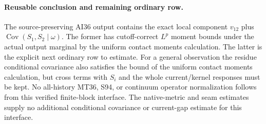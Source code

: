 \documentclass[11pt]{article}
\newcommand{\Cov}{\operatorname{Cov}}
\begin{document}
\paragraph{Reusable conclusion and remaining ordinary row.}
The source-preserving AI36 output contains the exact local component $v_{12}$ plus
$\Cov(S_1,S_2\mid\omega)$. The former has cutoff-correct $L^p$ moment bounds under the
actual output marginal by the uniform contact moments calculation. The latter is the explicit next ordinary row to estimate.
For a general observation the residue conditional covariance also satisfies the bound of the uniform contact moments calculation,
but cross terms with $S_i$ and the whole current/kernel responses must be kept.
No all-history MT36, S94, or continuum operator normalization follows from this verified
finite-block interface. The native-metric and seam estimates supply no
additional conditional covariance or current-gap estimate for this interface.
\end{document}
